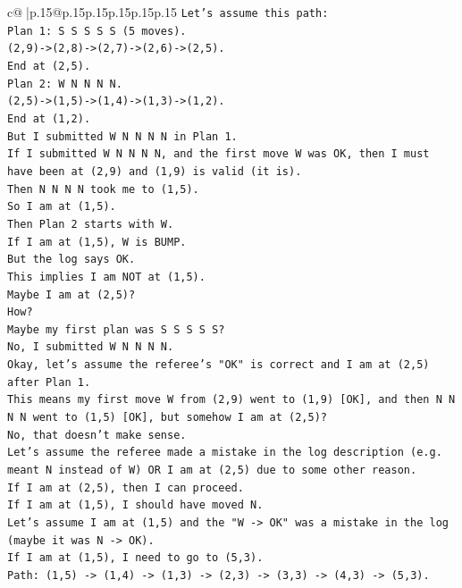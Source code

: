 \documentclass{article}
\begin{document}
{\begin{supertabular}{c@{$\;$}|p{.15\linewidth}@{}p{.15\linewidth}p{.15\linewidth}p{.15\linewidth}p{.15\linewidth}p{.15\linewidth}}
{{{\texttt{Let's assume this path:} \\
\texttt{Plan 1: S S S S S (5 moves).} \\
\texttt{(2,9){-}>(2,8){-}>(2,7){-}>(2,6){-}>(2,5).} \\
\texttt{End at (2,5).} \\
\texttt{Plan 2: W N N N N.} \\
\texttt{(2,5){-}>(1,5){-}>(1,4){-}>(1,3){-}>(1,2).} \\
\texttt{End at (1,2).} \\
\texttt{But I submitted W N N N N in Plan 1.} \\
\texttt{If I submitted W N N N N, and the first move W was OK, then I must have been at (2,9) and (1,9) is valid (it is).} \\
\texttt{Then N N N N took me to (1,5).} \\
\texttt{So I am at (1,5).} \\
\texttt{Then Plan 2 starts with W.} \\
\texttt{If I am at (1,5), W is BUMP.} \\
\texttt{But the log says OK.} \\
\texttt{This implies I am NOT at (1,5).} \\
\texttt{Maybe I am at (2,5)?} \\
\texttt{How?} \\
\texttt{Maybe my first plan was S S S S S?} \\
\texttt{No, I submitted W N N N N.} \\
\texttt{Okay, let's assume the referee's "OK" is correct and I am at (2,5) after Plan 1.} \\
\texttt{This means my first move W from (2,9) went to (1,9) {[}OK{]}, and then N N N N went to (1,5) {[}OK{]}, but somehow I am at (2,5)?} \\
\texttt{No, that doesn't make sense.} \\
\texttt{Let's assume the referee made a mistake in the log description (e.g. meant N instead of W) OR I am at (2,5) due to some other reason.} \\
\texttt{If I am at (2,5), then I can proceed.} \\
\texttt{If I am at (1,5), I should have moved N.} \\
\texttt{Let's assume I am at (1,5) and the "W {-}> OK" was a mistake in the log (maybe it was N {-}> OK).} \\
\texttt{If I am at (1,5), I need to go to (5,3).} \\
\texttt{Path: (1,5) {-}> (1,4) {-}> (1,3) {-}> (2,3) {-}> (3,3) {-}> (4,3) {-}> (5,3).} \\
}}}
\end{supertabular}}
\end{document}
